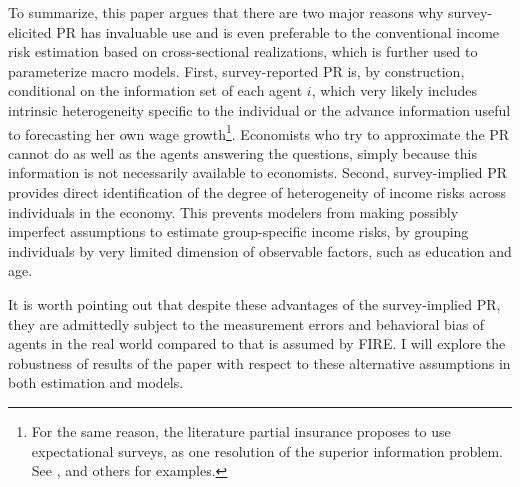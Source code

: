 To summarize, this paper argues that there are two major reasons why survey-elicited PR has invaluable use and is even preferable to the conventional income risk estimation based on cross-sectional realizations, which is further used to parameterize macro models. First, survey-reported PR is, by construction, conditional on the information set of each agent $i$, which very likely includes intrinsic heterogeneity specific to the individual or the advance information useful to  forecasting her own wage growth\footnote{For the same reason, the literature partial insurance proposes to use expectational surveys, as one resolution of the superior information problem. See \cite{pistaferri_superior_2001}, \cite{kaufmann_disentangling_2009} and others for examples.}. Economists who try to approximate the PR cannot do as well as the agents answering the questions, simply because this information is not necessarily available to economists. Second, survey-implied PR provides direct identification of the degree of heterogeneity of income risks across individuals in the economy. This prevents modelers from making possibly imperfect assumptions to estimate group-specific income risks, by grouping individuals by very limited dimension of observable factors, such as education and age. 

It is worth pointing out that despite these advantages of the survey-implied PR, they are admittedly subject to the measurement errors and behavioral bias of agents in the real world compared to that is assumed by FIRE. I will explore the robustness of results of the paper with respect to these alternative assumptions in both estimation and models.



